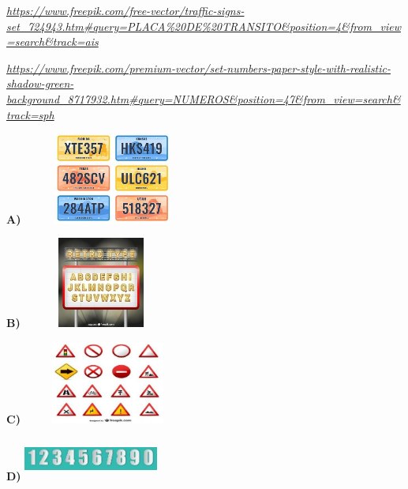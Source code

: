 \begin{escola}
{{{{{{{{{{{{{{{\href{https://www.freepik.com/free-vector/traffic-signs-set_724943.htm\#query=PLACA\%20DE\%20TRANSITO\&position=4\&from_view=search\&track=ais}{\emph{https://www.freepik.com/free-vector/traffic-signs-set\_724943.htm\#query=PLACA\%20DE\%20TRANSITO\&position=4\&from\_view=search\&track=ais}}

\href{https://www.freepik.com/premium-vector/set-numbers-paper-style-with-realistic-shadow-green-background_8717932.htm\#query=NUMEROS\&position=47\&from_view=search\&track=sph}{\emph{https://www.freepik.com/premium-vector/set-numbers-paper-style-with-realistic-shadow-green-background\_8717932.htm\#query=NUMEROS\&position=47\&from\_view=search\&track=sph}}

\begin{escolha}
\item\textbf{A)} \includegraphics[width=2.32569in,height=1.18472in]{media/image222.jpg}

\item\textbf{B)} \includegraphics[width=2.03125in,height=1.17361in]{media/image223.jpg}

\item\textbf{C)} \includegraphics[width=2.20764in,height=1.07569in]{media/image224.jpg}

\item\textbf{D)} \includegraphics[width=1.75000in,height=0.54792in]{media/image225.jpg}
\end{escolha}

}}}}}}}}}}}}}}}
\end{escola}
